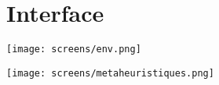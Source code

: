 
\chapter{Interface} %

\label{AppendixD} %


\begin{center}	  
	\captionsetup{width=1\linewidth}
	\texttt{[image: screens/env.png]}%
	\vspace{-0.1 cm}
	\label{uienv}%
\end{center}

\begin{center}	  
	\captionsetup{width=1\linewidth}
	\texttt{[image: screens/metaheuristiques.png]}%
	\vspace{-0.1 cm}
	\label{uimeta}%
\end{center}
